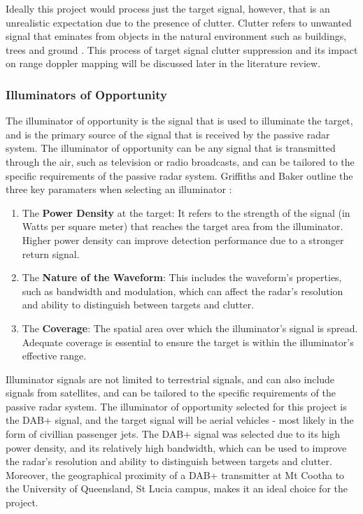 \documentclass[12pt,a4paper]{article}
\begin{document}
\par \vspace{0.5cm} 
\noindent Ideally this project would process just the target signal, however, that is an unrealistic expectation due to the presence of clutter. Clutter refers to unwanted signal that eminates from objects in the natural environment such as buildings, trees and ground \cite{zhang2023intelligent}. This process of target signal clutter suppression and its impact on range doppler mapping will be discussed later in the literature review.  

\subsubsection{Illuminators of Opportunity}
The illuminator of opportunity is the signal that is used to illuminate the target, and is the primary source of the signal that is received by the passive radar system. The illuminator of opportunity can be any signal that is transmitted through the air, such as television or radio broadcasts, and can be tailored to the specific requirements of the passive radar system. Griffiths and Baker outline the three key paramaters when selecting an illuminator \cite{INTRO2017}:
\begin{enumerate}[label=\arabic*.]
    \item The \textbf{Power Density} at the target: It refers to the strength of the signal (in Watts per square meter) that reaches the target area from the illuminator. Higher power density can improve detection performance due to a stronger return signal.
    \item The \textbf{Nature of the Waveform}: This includes the waveform's properties, such as bandwidth and modulation, which can affect the radar's resolution and ability to distinguish between targets and clutter.
    \item The \textbf{Coverage}: The spatial area over which the illuminator's signal is spread. Adequate coverage is essential to ensure the target is within the illuminator's effective range.
\end{enumerate}
Illuminator signals are not limited to terrestrial signals, and can also include signals from satellites, and can be tailored to the specific requirements of the passive radar system. The illuminator of opportunity selected for this project is the DAB+  signal, and the target signal will be aerial vehicles - most likely in the form of civillian passenger jets. The DAB+ signal was selected due to its high power density, and its relatively high bandwidth, which can be used to improve the radar's resolution and ability to distinguish between targets and clutter. Moreover, the geographical proximity of a DAB+ transmitter at Mt Cootha to the University of Queensland, St Lucia campus, makes it an ideal choice for the project.
\end{document}
